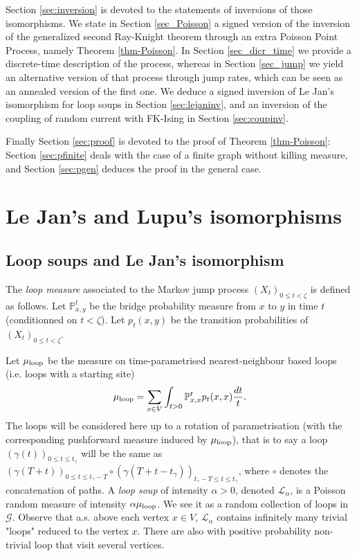\documentclass[11pt,a4paper]{amsart}
\numberwithin{equation}{section}
\begin{document}
Section \ref{sec:inversion} is devoted to the statements of inversions of those isomorphisms. We state in Section \ref{sec_Poisson} a signed version of the inversion of the generalized second Ray-Knight theorem through an extra Poisson Point Process, namely Theorem \ref{thm-Poisson}. In Section \ref{sec_dicr_time} we provide a discrete-time description of the process, whereas in Section \ref{sec_jump} we yield  an alternative version of that process through jump rates, which can be seen as an annealed version of the first one. We deduce a signed inversion of Le Jan's isomorphism for loop soups in Section \ref{sec:lejaninv}, and an inversion of the coupling of random current with FK-Ising in Section \ref{sec:coupinv}.%

Finally Section \ref{sec:proof} is devoted to the proof of Theorem \ref{thm-Poisson}: Section \ref{sec:pfinite} deals with the case of a finite graph without killing measure, and Section \ref{sec:pgen} deduces the proof in the general case.  

\section{Le Jan's and Lupu's isomorphisms}
\label{sec:srk}
\subsection{Loop soups and Le Jan's isomorphism}
\label{sec:lejan}
The \textit{loop measure} associated to the Markov jump process
$(X_{t})_{0\leq t<\zeta}$ is defined as follows. Let $\mathbb{P}^{t}_{x,y}$ be the bridge probability measure from 
$x$ to $y$ in time $t$ (conditionned on $t<\zeta$). Let $p_{t}(x,y)$ be the transition probabilities of 
$(X_{t})_{0\leq t<\zeta}$. 

Let $\mu_{\rm loop}$ be the measure on time-parametrised nearest-neighbour based loops (i.e. loops with a starting site)
\begin{displaymath}
\mu_{\rm loop}=\sum_{x\in V}\int_{t>0}\mathbb{P}^{t}_{x,x} p_{t}(x,x) \dfrac{dt}{t}.
\end{displaymath}
The loops will be considered here up to a rotation of parametrisation (with the corresponding pushforward measure induced by $\mu_{\rm loop}$), that is to say a loop $(\gamma(t))_{0\leq t\leq t_{\gamma}}$ will be the same as 
$(\gamma(T+t))_{0\leq t\leq t_{\gamma}-T}\circ (\gamma(T+t-t_{\gamma}))_{t_{\gamma}-T\leq t\leq t_{\gamma}}$, where $\circ$ denotes the concatenation of paths.
A \textit{loop soup} of intensity $\alpha>0$, denoted 
$\mathcal{L}_{\alpha}$, is a Poisson random measure of intensity
$\alpha \mu_{\rm loop}$. We see it as a random collection of loops in $\mathcal{G}$. Observe that a.s. above each vertex 
$x\in V$, $\mathcal{L}_{\alpha}$ contains infinitely many trivial "loops" reduced to the vertex $x$. There are also with positive probability non-trivial loop that visit several vertices. 
\end{document}
